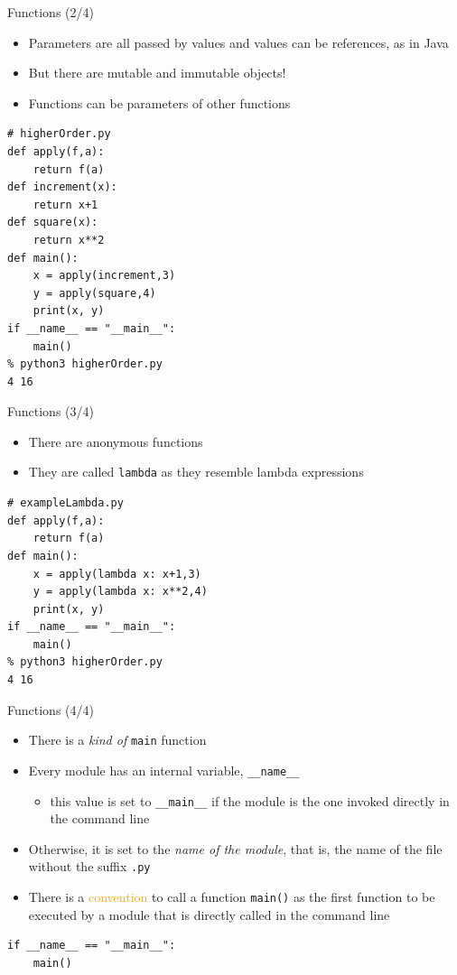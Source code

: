 \documentclass{beamer}
\begin{document}
\begin{frame}[fragile]
{\centerline{Functions (2/4)}}
\begin{itemize}
    \item Parameters are all passed by values and values can be references, as in Java
    \item But there are  mutable and immutable objects!
    \item Functions can be parameters of other functions
     \end{itemize}
 \begin{lstlisting}[style=myPythonStyle]
# higherOrder.py
def apply(f,a):
	return f(a)
def increment(x):
	return x+1
def square(x):
	return x**2
def main():
	x = apply(increment,3)
	y = apply(square,4)
	print(x, y)
if __name__ == "__main__":
	main()
% python3 higherOrder.py
4 16	
\end{lstlisting}

\end{frame}

\begin{frame}[fragile]
{\centerline{Functions (3/4)}}
\begin{itemize}
    \item There are anonymous functions
    \item They are called \texttt{lambda} as they resemble lambda expressions
     \end{itemize}
 \begin{lstlisting}[style=myPythonStyle]
# exampleLambda.py
def apply(f,a):
	return f(a)
def main():
	x = apply(lambda x: x+1,3)
	y = apply(lambda x: x**2,4)
	print(x, y)
if __name__ == "__main__":
	main()
% python3 higherOrder.py
4 16	
\end{lstlisting}

\end{frame}

\begin{frame}[fragile]
{\centerline{Functions (4/4)}}
\begin{itemize}
    \item There is a \textit{kind of} \texttt{main} function
    \item Every module has an internal variable, \texttt{\_\_name\_\_}
    \begin{itemize}
    	\item this value is set to \texttt{\_\_main\_\_} if the module is the one invoked directly in the command line
    \end{itemize}
    \item Otherwise, it is set to the \textit{name of the module}, that is, the name of the file without the suffix \texttt{.py}
    \item There is a \textcolor{orange}{convention} to call a function \texttt{main()} as the first function to be executed by a module that is directly called in the command line
     \end{itemize}
\begin{lstlisting}[style=myPythonStyle]
if __name__ == "__main__":
	main()
\end{lstlisting}

\end{frame}
\end{document}
